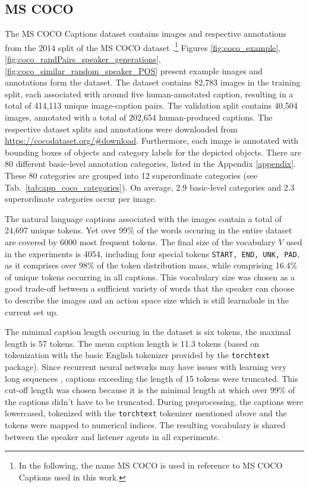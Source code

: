 \subsection{MS COCO}
\label{ds:coco}
The MS COCO Captions dataset \parencite{chen2015microsoft} contains images and respective annotations from the 2014 split of the MS COCO dataset \parencite{lin2014microsoft}.\footnote{In the following, the name MS COCO is used in reference to MS COCO Captions used in this work.} Figures \ref{fig:coco_example}, \ref{fig:coco_randPairs_speaker_generations}, \ref{fig:coco_similar_random_speaker_POS} present example images and annotations form the dataset. The dataset contains 82,783 images in the training split, each associated with around five human-annotated caption, resulting in a total of 414,113 unique image-caption pairs. The validation split contains 40,504 images, annotated with a total of 202,654 human-produced captions. The respective dataset splits and annotations were downloaded from \url{https://cocodataset.org/#download}.
Furthermore, each image is annotated with bounding boxes of objects and category labels for the depicted objects. There are 80 different basic-level annotation categories, listed in the Appendix \ref{appendix}. These 80 categories are grouped into 12 superordinate categories (see Tab.~\ref{tab:app_coco_categories}).
On average, 2.9 basic-level categories and 2.3 superordinate categories occur per image.

The natural language captions associated with the images contain a total of 24,697 unique tokens. Yet over 99\% of the words occuring in the entire dataset are covered by 6000 most frequent tokens. 
The final size of the vocabulary $V$ used in the experiments is 4054, including four special tokens \texttt{START, END, UNK, PAD}, as it comprises over 98\% of the token distribution mass, while comprising 16.4\% of unique tokens occurring in all captions. This vocabulary size was chosen as a good trade-off between a sufficient variety of words that the speaker can choose to describe the images and an action space size which is still learnabale in the current set up. 

The minimal caption length occuring in the dataset is six tokens, the maximal length is 57 tokens. The mean caption length is 11.3 tokens (based on tokenization with the basic English tokenizer provided by the \texttt{torchtext} package). Since recurrent neural networks may have issues with learning very long sequences \parencite[e.g.,][]{jaeger2002tutorial}, captions exceeding the length of 15 tokens were truncated. This cut-off length was chosen because it is the minimal length at which over 99\% of the captions didn't have to be truncated. 
During preprocessing, the captions were lowercased, tokenized with the \texttt{torchtext} tokenizer mentioned above and the tokens were mapped to numerical indices. The resulting vocabulary is shared between the speaker and listener agents in all experiments. 

